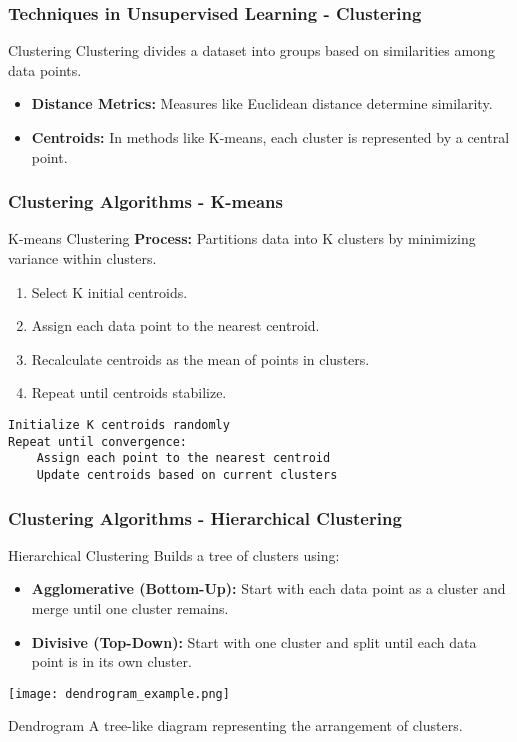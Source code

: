 \documentclass[aspectratio=169]{beamer}
\begin{document}
\begin{frame}[fragile]
    \frametitle{Techniques in Unsupervised Learning - Clustering}
    \begin{block}{Clustering}
        Clustering divides a dataset into groups based on similarities among data points.
    \end{block}
    \begin{itemize}
        \item \textbf{Distance Metrics:} Measures like Euclidean distance determine similarity.
        \item \textbf{Centroids:} In methods like K-means, each cluster is represented by a central point.
    \end{itemize}
\end{frame}

\begin{frame}[fragile]
    \frametitle{Clustering Algorithms - K-means}
    \begin{block}{K-means Clustering}
        \textbf{Process:} Partitions data into K clusters by minimizing variance within clusters.
        \begin{enumerate}
            \item Select K initial centroids.
            \item Assign each data point to the nearest centroid.
            \item Recalculate centroids as the mean of points in clusters.
            \item Repeat until centroids stabilize.
        \end{enumerate}
    \end{block}
    \begin{lstlisting}
Initialize K centroids randomly
Repeat until convergence:
    Assign each point to the nearest centroid
    Update centroids based on current clusters
    \end{lstlisting}
\end{frame}

\begin{frame}[fragile]
    \frametitle{Clustering Algorithms - Hierarchical Clustering}
    \begin{block}{Hierarchical Clustering}
        Builds a tree of clusters using:
        \begin{itemize}
            \item \textbf{Agglomerative (Bottom-Up):} Start with each data point as a cluster and merge until one cluster remains.
            \item \textbf{Divisive (Top-Down):} Start with one cluster and split until each data point is in its own cluster.
        \end{itemize}
    \end{block}
    \texttt{[image: dendrogram\_example.png]}
    \begin{block}{Dendrogram}
        A tree-like diagram representing the arrangement of clusters.
    \end{block}
\end{frame}
\end{document}
